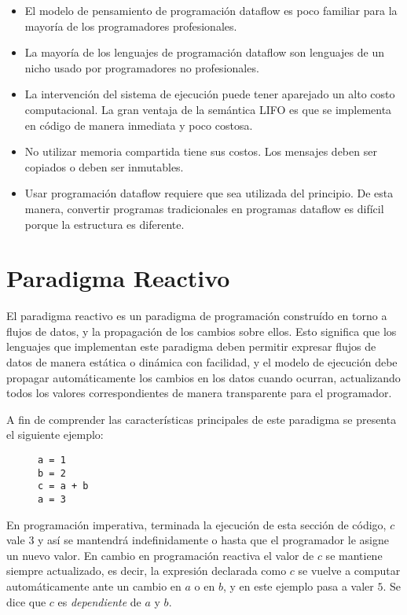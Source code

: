 \begin{itemize}
  \item El modelo de pensamiento de programación dataflow es poco familiar para
  la mayoría de los programadores profesionales.
  \item La mayoría de los lenguajes de programación dataflow son lenguajes de
  un nicho usado por programadores no profesionales.
  \item La intervención del sistema de ejecución puede tener aparejado un alto
  costo computacional. La gran ventaja de la semántica LIFO es que se implementa
  en código de manera inmediata y poco costosa.
  \item No utilizar memoria compartida tiene sus costos. Los mensajes deben ser
  copiados o deben ser inmutables.
  \item Usar programación dataflow requiere que sea utilizada del principio. De
  esta manera, convertir programas tradicionales en programas dataflow es
  difícil porque la estructura es diferente.
\end{itemize}

\section{Paradigma Reactivo}

El paradigma reactivo es un paradigma de programación construído en torno a
flujos de datos, y la propagación de los cambios sobre ellos. Esto significa que
los lenguajes que implementan este paradigma deben permitir expresar flujos de
datos de manera estática o dinámica con facilidad, y el modelo de ejecución
debe propagar automáticamente los cambios en los datos cuando ocurran,
actualizando todos los valores correspondientes de manera transparente para el
programador.

A fin de comprender las características principales de este paradigma se
presenta el siguiente ejemplo:

\begin{figure}[h!]
\centering
\begin{verbatim}
a = 1
b = 2
c = a + b
a = 3
\end{verbatim}
\end{figure}

En programación imperativa, terminada la ejecución de esta sección de código,
$c$ vale $3$ y así se mantendrá indefinidamente o hasta que el programador le
asigne un nuevo valor. En cambio en programación reactiva el valor de $c$ se
mantiene siempre actualizado, es decir, la expresión declarada como $c$
se vuelve a computar automáticamente ante un cambio en $a$ o en $b$, y en este
ejemplo pasa a valer $5$. Se dice que $c$ es \textit{dependiente} de $a$ y $b$.
\cite{Bainomugisha:2013:SRP:2501654.2501666}

